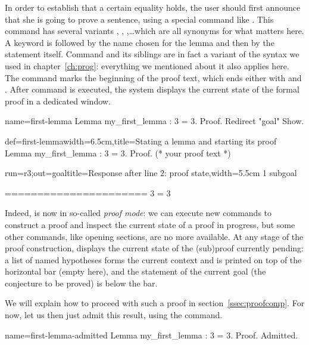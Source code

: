 In order to establish that a certain equality holds, the user should
first announce that she is going to prove a sentence, using a special
command like . This command has several variants ,
, ,\dots which are all synonyms for what
matters here.
A  keyword is followed by the name chosen for the lemma and
then by the statement itself. Command  and its siblings are in fact
a variant of the  syntax we used in
chapter~\ref{ch:prog}: everything we mentioned about it also applies
here. The  command marks the beginning of the proof text,
which ends either with  and . After command
 is executed, the system displays the current state of the
formal proof in a dedicated window.

\begin{coqdef}{name=first-lemma}
Lemma my_first_lemma : 3 = 3.
Proof. Redirect "goal" Show.
\end{coqdef}
\begin{coq}{def=first-lemma}{width=6.5cm,title=Stating a lemma and starting its proof}
Lemma my_first_lemma : 3 = 3.
Proof.
(* your proof text *)
$~$
\end{coq}
\begin{coqout}{run=r3;out=goal}{title=Response after line 2: proof state,width=5.5cm}
1 subgoal

  ======================
   3 = 3
\end{coqout}

Indeed, \Coq{} is now in so-called \emph{proof mode}: we can execute
new commands to construct a proof and inspect the current state of a
proof in progress, but some other commands, like opening sections, are
no more available. At any stage of the proof construction, \Coq{}
displays the current state of the (sub)proof currently pending:  a
list of named hypotheses forms the current context and is printed
on top of the horizontal bar (empty here), and
the statement of the current goal (the conjecture to be proved) is
below the bar.

We will explain how to proceed with such a proof in
section~\ref{ssec:proofcomp}.
For now, let us then just admit this result, using the 
command.

\begin{coq}{name=first-lemma-admitted}{}
Lemma my_first_lemma : 3 = 3.
Proof.
Admitted.
\end{coq}

